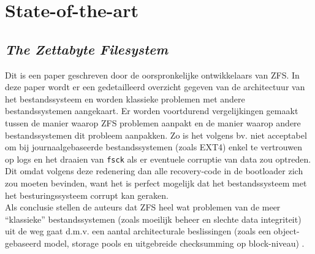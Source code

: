 \documentclass[fleqn,10pt]{voorstel}
\begin{document}
\newpage

\section{State-of-the-art}
\label{sec:state-of-the-art}





\subsection{\textit{The Zettabyte Filesystem} \autocite{ZFSBonwick}}

Dit is een paper geschreven door de oorspronkelijke ontwikkelaars van ZFS. In deze paper wordt er een gedetailleerd overzicht gegeven van de architectuur van het bestandssysteem en worden klassieke problemen met andere bestandssystemen aangekaart. Er worden voortdurend vergelijkingen gemaakt tussen de manier waarop ZFS problemen aanpakt en de manier waarop andere bestandssystemen dit probleem aanpakken. Zo is het volgens \textcite{ZFSBonwick} bv. niet acceptabel om bij journaalgebaseerde bestandssystemen (zoals EXT4) enkel te vertrouwen op logs en het draaien van \texttt{fsck} als er eventuele corruptie van data zou optreden. Dit omdat volgens deze redenering dan alle recovery-code in de bootloader zich zou moeten bevinden, want het is perfect mogelijk dat het bestandssysteem met het besturingssysteem corrupt kan geraken. \\
Als conclusie stellen de auteurs dat ZFS heel wat problemen van de meer ``klassieke'' bestandssystemen (zoals moeilijk beheer en slechte data integriteit) uit de weg gaat d.m.v. een aantal architecturale beslissingen (zoals een object-gebaseerd model, storage pools en uitgebreide checksumming op block-niveau) \autocite{ZFSBonwick}.
\end{document}
